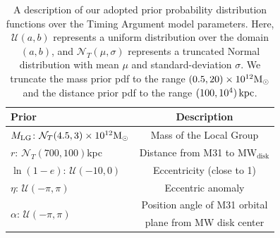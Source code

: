 \documentclass[twocolumn]{aastex631}
\newcommand{\mlg}{\ensuremath{M_{\rm LG}}}
\newcommand{\mwdisk}{\ensuremath{\textrm{MW}_\textrm{disk}}}
\begin{document}
\begin{table}
  \centering
  \begin{tabular}{lc}
  \hline\hline
  Prior  & Description \\\hline
  \mlg: $\mathcal{N}_T(4.5,3)\times10^{12}\mathrm{M}_\odot$ & Mass of the Local Group\\
  $r$: $\mathcal{N}_T(700,100)$kpc & Distance from M31 to $\mwdisk$\\
  $\ln(1-e)$: $\mathcal{U}(-10,0)$ & Eccentricity (close to 1) \\
  $\eta$: $\mathcal{U}(-\pi, \pi)$ & Eccentric anomaly\\
  \multirow{2}{*}{$\alpha$: $\mathcal{U}(-\pi, \pi)$} & Position angle of M31
  orbital\\
  & plane from MW disk center\\
  \hline\hline
  \end{tabular}
  \caption{\label{table:priors} A description of our adopted prior probability
  distribution functions over the Timing Argument model parameters.
  Here, $\mathcal{U}(a, b)$ represents a uniform distribution over the domain
  $(a, b)$, and $\mathcal{N}_T(\mu, \sigma)$ represents a truncated Normal
  distribution with mean $\mu$ and standard-deviation $\sigma$.
  We truncate the mass prior pdf to the range $(0.5, 20)\times10^{12} \mathrm{M}_\odot$ and
  the distance prior pdf to the range $(100, 10^{4})\,\mathrm{kpc}$.
  }
\end{table}


\end{document}
